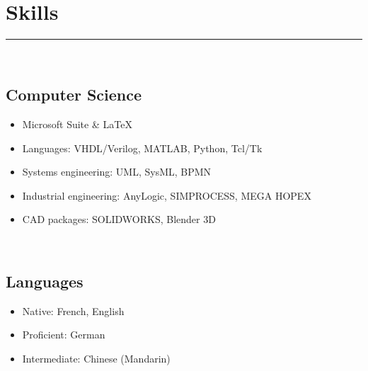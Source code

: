 \documentclass[10pt]{article}
\begin{document}
\section*{Skills}
\rule{\linewidth}{1pt}\\[0.2cm]
\begin{minipage}[t]{0.52\linewidth}
    \subsection*{Computer Science}
    \begin{itemize}
        \item Microsoft Suite \& \LaTeX
        \item Languages: VHDL/Verilog, MATLAB, Python, Tcl/Tk
        \item Systems engineering: UML, SysML, BPMN
        \item Industrial engineering: AnyLogic, SIMPROCESS, MEGA HOPEX
        \item CAD packages: SOLIDWORKS, Blender 3D
    \end{itemize}
\end{minipage}
~
\begin{minipage}[t]{0.44\linewidth}
    \subsection*{Languages}
    \begin{itemize}
        \item Native: French, English
        \item Proficient: German
        \item Intermediate: Chinese (Mandarin)
    \end{itemize}
\end{minipage}
\end{document}
